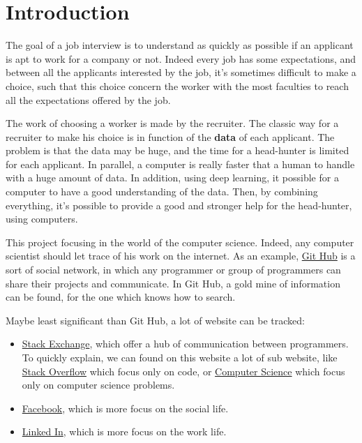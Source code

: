\documentclass{article}
\begin{document}
\section{Introduction}
The goal of a job interview is to understand as quickly as possible if an applicant is apt to work for a company or not. Indeed every job has some expectations, and between all the applicants interested by the job, it's sometimes difficult to make a choice, such that this choice concern the worker with the most faculties to reach all the expectations offered by the job. \par
The work of choosing a worker is made by the recruiter. The classic way for a recruiter to make his choice is in function of the \textbf{data} of each applicant. The problem is that the data may be huge, and the time for a head-hunter is limited for each applicant. In parallel, a computer is really faster that a human to handle with a huge amount of data. In addition, using deep learning, it possible for a computer to have a good understanding of the data. Then, by combining everything, it's possible to provide a good and stronger help for the head-hunter, using computers. \par
This project focusing in the world of the computer science. Indeed, any computer scientist should let trace of his work on the internet. As an example, \href{https://github.com/}{Git Hub} is a sort of social network, in which any programmer or group of programmers can share their projects and communicate. In Git Hub, a gold mine of information can be found, for the one which knows how to search. \par
Maybe least significant than Git Hub, a lot of website can be tracked:
\begin{itemize}
  \item \href{https://stackexchange.com/}{Stack Exchange}, which offer a hub of communication between programmers. To quickly explain, we can found on this website a lot of sub website, like \href{https://stackoverflow.com/}{Stack Overflow} which focus only on code, or \href{https://cs.stackexchange.com/}{Computer Science} which focus only on computer science problems.
  \item \href{https://www.facebook.com/}{Facebook}, which is more focus on the social life.
  \item \href{https://www.linkedin.com/feed/}{Linked In}, which is more focus on the work life. 
  \end{itemize} \par
\end{document}
